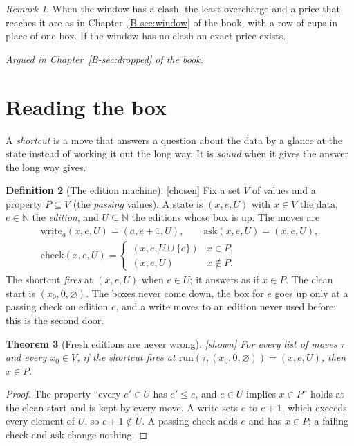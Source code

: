 \documentclass[11pt, a4paper]{article}
\theoremstyle{plain}
\newtheorem{theorem}{Theorem}[section]
\theoremstyle{definition}
\newtheorem{definition}[theorem]{Definition}
\theoremstyle{remark}
\newtheorem{remark}[theorem]{Remark}
\newcommand{\N}{\mathbb{N}}
\newcommand{\run}{\mathrm{run}}
\newcommand{\argued}[1]{\par\noindent\textit{Argued in Chapter~\ref{B-#1} of the book.}\par}
\newcommand{\kind}[1]{\textup{[#1]}}
\begin{document}
\begin{remark}
When the window has a clash, the least overcharge and a price that reaches it are as in
Chapter~\ref{B-sec:window} of the book, with a row of cups in place of one box. If the window has no clash an
exact price exists.
\end{remark}

\argued{sec:dropped}

\section{Reading the box}\label{spec:ch16}

A \emph{shortcut} is a move that answers a question about the data by a glance at the state instead of
working it out the long way. It is \emph{sound} when it gives the answer the long way gives.

\begin{definition}[The edition machine]\label{spec:edition-machine} \kind{chosen}
Fix a set $V$ of values and a property $P\subseteq V$ (the \emph{passing} values). A state is $(x,e,U)$ with
$x\in V$ the data, $e\in\N$ the \emph{edition}, and $U\subseteq\N$ the editions whose box is up. The moves are
\begin{gather*}
\mathrm{write}_a(x,e,U)=(a,e+1,U),\qquad\mathrm{ask}(x,e,U)=(x,e,U),\\
\mathrm{check}(x,e,U)=\begin{cases}(x,e,U\cup\{e\})&x\in P,\\(x,e,U)&x\notin P.\end{cases}
\end{gather*}
The shortcut \emph{fires} at $(x,e,U)$ when $e\in U$; it answers as if $x\in P$. The clean start is
$(x_0,0,\varnothing)$. The boxes never come down, the box for $e$ goes up only at a passing check on edition
$e$, and a write moves to an edition never used before: this is the second door.
\end{definition}

\begin{theorem}[Fresh editions are never wrong]\label{spec:fresh-editions} \kind{shown}
For every list of moves $\tau$ and every $x_0\in V$, if the shortcut fires at
$\run(\tau,(x_0,0,\varnothing))=(x,e,U)$, then $x\in P$.
\end{theorem}

\begin{proof}
The property ``every $e'\in U$ has $e'\le e$, and $e\in U$ implies $x\in P$'' holds at the clean start and
is kept by every move. A write sets $e$ to $e+1$, which exceeds every element of $U$, so $e+1\notin U$. A
passing check adds $e$ and has $x\in P$; a failing check and $\mathrm{ask}$ change nothing.
\end{proof}
\end{document}
